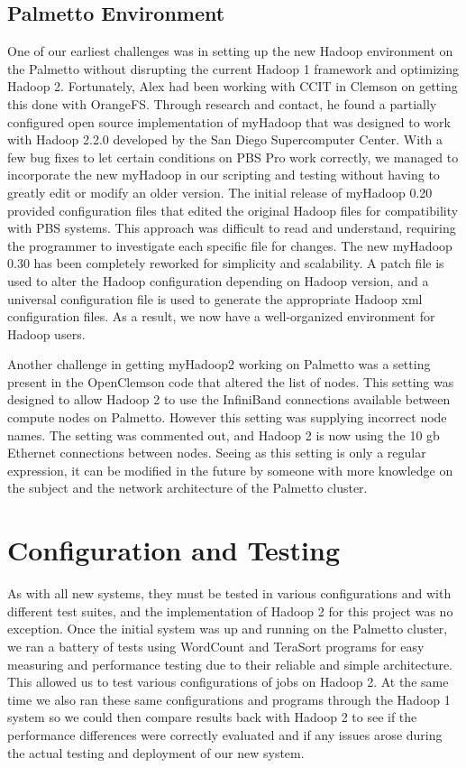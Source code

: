 \documentclass[conference]{IEEEtran}
\begin{document}
			\subsection{Palmetto Environment}
				One of our earliest challenges was in setting up the new Hadoop environment on the Palmetto without disrupting the current Hadoop 1 framework and optimizing Hadoop 2. Fortunately, Alex had been working with CCIT in Clemson on getting this done with OrangeFS. Through research and contact, he found a partially configured open source implementation of myHadoop that was designed to work with Hadoop 2.2.0 developed by the San Diego Supercomputer Center. With a few bug fixes to let certain conditions on PBS Pro work correctly, we managed to incorporate the new myHadoop in our scripting and testing without having to greatly edit or modify an older version. The initial release of myHadoop 0.20 provided configuration files that edited the original Hadoop files for compatibility with PBS systems. This approach was difficult to read and understand, requiring the programmer to investigate each specific file for changes. The new myHadoop 0.30 has been completely reworked for simplicity and scalability.  A patch file is used to alter the Hadoop configuration depending on Hadoop version, and a universal configuration file is used to generate the appropriate Hadoop xml configuration files. As a result, we now have a well-organized environment for Hadoop users.


                Another challenge in getting myHadoop2 working on Palmetto was a setting present in the OpenClemson code that altered the list of nodes. This setting was designed to allow Hadoop 2 to use the InfiniBand connections available between compute nodes on Palmetto. However this setting was supplying incorrect node names. The setting was commented out, and Hadoop 2 is now using the 10 gb Ethernet connections between nodes. Seeing as this setting is only a regular expression, it can be modified in the future by someone with more knowledge on the subject and the network architecture of the Palmetto cluster.


		\section{Configuration and Testing}
			As with all new systems, they must be tested in various configurations and with different test suites, and the implementation of Hadoop 2 for this project was no exception. Once the initial system was up and running on the Palmetto cluster, we ran a battery of tests using WordCount and TeraSort programs for easy measuring and performance testing due to their reliable and simple architecture. This allowed us to test various configurations of jobs on Hadoop 2. At the same time we also ran these same configurations and programs through the Hadoop 1 system so we could then compare results back with Hadoop 2 to see if the performance differences were correctly evaluated and if any issues arose during the actual testing and deployment of our new system.
\end{document}
